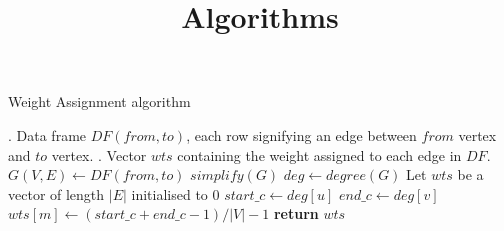 \documentclass[a4paper]{article}
\title{Algorithms}
\begin{document}
\maketitle


\begin{algorithm}
\caption{Weight Assignment algorithm}\label{algo:wa}

\begin{algorithmic}[1]
\INPUT
    . Data frame $DF(from, to)$, each row signifying an edge between $from$ vertex and $to$ vertex.
\OUTPUT
    . Vector $wts$ containing the weight assigned to each edge in $DF$. 
\Statex 
{}
    \State $G(V, E) \gets DF(from, to)$
    \State $simplify(G)$
    \State $deg \gets degree(G)$
    \State Let $wts$ be a vector of length $|E|$ initialised to $0$
        \State $start\_c \gets deg[u]$
        \State $end\_c \gets deg[v]$
        \State $wts[m] \gets (start\_c + end\_c - 1) / |V| - 1$
    \EndFor \label{wa_mendfor}
    \State \textbf{return} $wts$
\EndProcedure

\end{algorithmic}
\end{algorithm}

\end{document}
